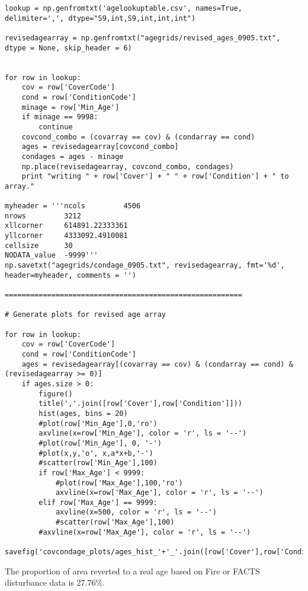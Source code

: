\begin{lstlisting}
lookup = np.genfromtxt('agelookuptable.csv', names=True, delimiter=',', dtype="S9,int,S9,int,int,int")

revisedagearray = np.genfromtxt("agegrids/revised_ages_0905.txt", dtype = None, skip_header = 6)


for row in lookup:
    cov = row['CoverCode']
    cond = row['ConditionCode']
    minage = row['Min_Age']
    if minage == 9998:
        continue 
    covcond_combo = (covarray == cov) & (condarray == cond)
    ages = revisedagearray[covcond_combo]
    condages = ages - minage
    np.place(revisedagearray, covcond_combo, condages)
    print "writing " + row['Cover'] + " " + row['Condition'] + " to array."

myheader = '''ncols         4506
nrows         3212
xllcorner     614891.22333361
yllcorner     4333092.4910081
cellsize      30
NODATA_value  -9999'''
np.savetxt("agegrids/condage_0905.txt", revisedagearray, fmt='%d', header=myheader, comments = '')

========================================================

# Generate plots for revised age array

for row in lookup:
    cov = row['CoverCode']
    cond = row['ConditionCode']
    ages = revisedagearray[(covarray == cov) & (condarray == cond) & (revisedagearray >= 0)]
    if ages.size > 0:
        figure()
        title(','.join([row['Cover'],row['Condition']]))
        hist(ages, bins = 20)
        #plot(row['Min_Age'],0,'ro')
        axvline(x=row['Min_Age'], color = 'r', ls = '--')
        #plot(row['Min_Age'], 0, '-')
        #plot(x,y,'o', x,a*x+b,'-')
        #scatter(row['Min_Age'],100)
        if row['Max_Age'] < 9999:
            #plot(row['Max_Age'],100,'ro')
            axvline(x=row['Max_Age'], color = 'r', ls = '--')
        elif row['Max_Age'] == 9999:
            axvline(x=500, color = 'r', ls = '--')
            #scatter(row['Max_Age'],100)
        #axvline(x=row['Max_Age'], color = 'r', ls = '--')
        savefig('covcondage_plots/ages_hist_'+'_'.join([row['Cover'],row['Condition']])+'.png')     
\end{lstlisting}

The proportion of area reverted to a real age based on Fire or FACTS disturbance data is 27.76\%.

